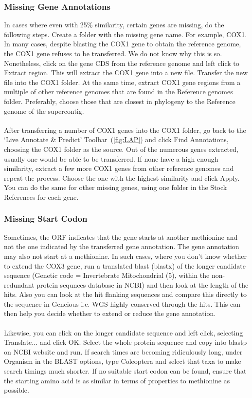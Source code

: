 \documentclass[11pt]{article}
\begin{document}
\subsubsection{Missing Gene Annotations}
\label{missinggene}
In cases where even with 25\% similarity, certain genes are missing, do the following steps. Create a folder with the missing gene name. For example, COX1. In many cases, despite blasting the COX1 gene to obtain the reference genome, the COX1 gene refuses to be transferred. We do not know why this is so. Nonetheless, click on the gene CDS from the reference genome and left click to Extract region. This will extract the COX1 gene into a new file. Transfer the new file into the COX1 folder. At the same time, extract COX1 gene regions from a multiple of other reference genomes that are found in the Reference genomes folder. Preferably, choose those that are closest in phylogeny to the Reference genome of the supercontig. 
\\
\\
After transferring a number of COX1 genes into the COX1 folder, go back to the `Live Annotate \& Predict' Toolbar~(\autoref{fig:LAP}) and click Find Annotations, choosing the COX1 folder as the source. Out of the numerous genes extracted, usually one would be able to be transferred. If none have a high enough similarity, extract a few more COX1 genes from other reference genomes and repeat the process. Choose the one with the highest similarity and click Apply. You can do the same for other missing genes, using one folder in the Stock References for each gene.

\subsubsection{Missing Start Codon}
Sometimes, the ORF indicates that the gene starts at another methionine and not the one indicated by the transferred gene annotation. The gene annotation may also not start at a methionine. In such cases, where you don't know whether to extend the COX3 gene, run a translated blast (blastx) of the longer candidate sequence (Genetic code = Invertebrate Mitochondrial (5), within the non-redundant protein sequnces database in NCBI) and then look at the length of the hits. Also you can look at the hit flanking sequences and compare this directly to the sequence in Geneious i.e. WGS highly conserved through the hits. This can then help you decide whether to extend or reduce the gene annotation.
\\
\\
Likewise, you can click on the longer candidate sequence and left click, selecting Translate... and click OK. Select the whole protein sequence and copy into blastp on NCBI website and run. If search times are becoming ridiculously long, under Organism in the BLAST options, type Coleoptera and select that taxa to make search timings much shorter. If no suitable start codon can be found, ensure that the starting amino acid is as similar in terms of properties to methionine as possible.
\end{document}

